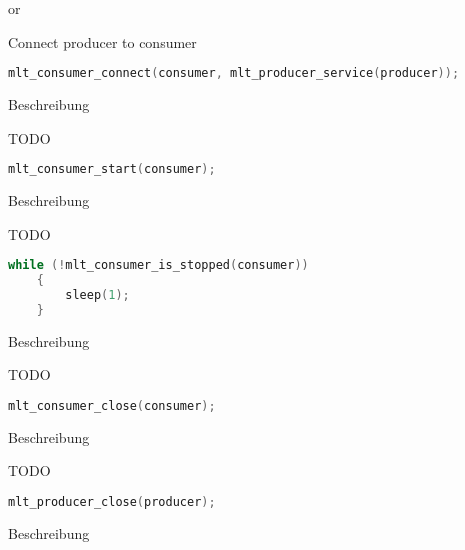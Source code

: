 \documentclass[../MasterThesis.tex]{subfiles}
\begin{document}
\begin{description}[font=\normalfont\color{RedViolet!80!black}, style=nextline]
	
	or 
	
	Connect producer to consumer
	
	\begin{lstlisting}[language=C, numbers=none, basicstyle=\scriptsize\ttfamily]
	mlt_consumer_connect(consumer, mlt_producer_service(producer)); \end{lstlisting}
	
	
	
	\item[Start consumer] Beschreibung
	
	TODO
	
	\begin{lstlisting}[language=C, numbers=none, basicstyle=\scriptsize\ttfamily]
	mlt_consumer_start(consumer);	\end{lstlisting}
	
	
	
	\item[Wait for consumer to terminate???] Beschreibung
	
	TODO
	
	\begin{lstlisting}[language=C, numbers=none, basicstyle=\scriptsize\ttfamily]
	while (!mlt_consumer_is_stopped(consumer)) 
	{
		sleep(1);
	} \end{lstlisting}
	
	
	
	
	\item[Close the consumer] Beschreibung
	
	TODO
	
	\begin{lstlisting}[language=C, numbers=none, basicstyle=\scriptsize\ttfamily]
	 mlt_consumer_close(consumer); \end{lstlisting}
	
	
	
	
	\item[Close the producer] Beschreibung
	
	TODO
	
	\begin{lstlisting}[language=C, numbers=none, basicstyle=\scriptsize\ttfamily]
	mlt_producer_close(producer); \end{lstlisting}
	
	
	
	
	\item[Close the profile] Beschreibung
	

\end{description}
\end{document}
